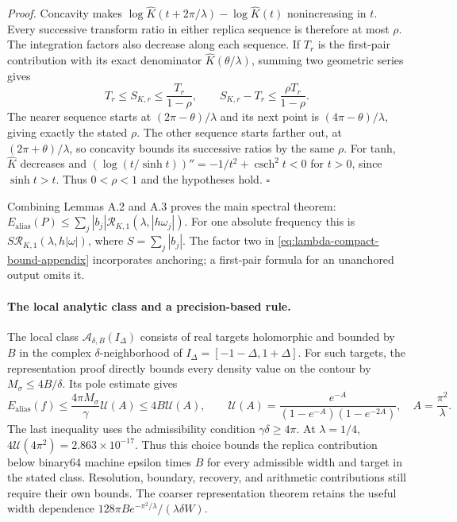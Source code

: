 \emph{Proof.}
Concavity makes
$\log \widehat K(t+2\pi/\lambda)-\log \widehat K(t)$ nonincreasing in $t$.
Every successive transform ratio in either replica sequence is therefore
at most $\rho$. The integration factors also decrease along each
sequence. If $T_r$ is the first-pair contribution with its exact
denominator $\widehat K(\theta/\lambda)$, summing two geometric series gives
\[
 T_r\le S_{K,r}\le\frac{T_r}{1-\rho},\qquad
 S_{K,r}-T_r\le\frac{\rho T_r}{1-\rho}.
\]
The nearer sequence starts at $(2\pi-\theta)/\lambda$ and its next
point is $(4\pi-\theta)/\lambda$, giving exactly the stated $\rho$.
The other sequence starts farther out, at $(2\pi+\theta)/\lambda$,
so concavity bounds its successive ratios by the same $\rho$.
For tanh, $\widehat K$ decreases and
$(\log(t/\sinh t))''=-1/t^2+\operatorname{csch}^2t<0$ for $t>0$,
since $\sinh t>t$. Thus $0<\rho<1$ and the hypotheses hold.
\hfill$\square$

Combining Lemmas A.2 and A.3 proves the main spectral theorem:
$E_{\mathrm{alias}}(P)\le\sum_j|b_j|
\mathcal R_{K,1}(\lambda,|h\omega_j|)$.
For one absolute frequency this is
$S\mathcal R_{K,1}(\lambda,h|\omega|)$, where
$S=\sum_j|b_j|$. The factor two in
\eqref{eq:lambda-compact-bound-appendix} incorporates anchoring; a
first-pair formula for an unanchored output omits it.

\paragraph{The local analytic class and a precision-based rule.}
The local class $\mathcal A_{\delta,B}(I_\Delta)$ consists of real targets
holomorphic and bounded by $B$ in the complex $\delta$-neighborhood of
$I_\Delta=[-1-\Delta,1+\Delta]$. For such targets, the representation
proof directly bounds every density value on the contour by
$M_\sigma\le4B/\delta$. Its pole estimate gives
\begin{equation}
 E_{\mathrm{alias}}(f)
 \le\frac{4\pi M_\sigma}{\gamma}\mathcal U(A)
 \le4B\mathcal U(A),\qquad
 \mathcal U(A)=\frac{e^{-A}}{(1-e^{-A})(1-e^{-2A})},\quad
 A=\frac{\pi^2}{\lambda}.
 \label{eq:lambda-local-class-budget}
\end{equation}
The last inequality uses the admissibility condition $\gamma\delta\ge4\pi$.
At $\lambda=1/4$, $4\mathcal U(4\pi^2)=2.863\times10^{-17}$.
Thus this choice bounds the replica contribution below binary64 machine
epsilon times $B$ for every admissible width and target in the stated
class. Resolution, boundary, recovery, and arithmetic contributions still
require their own bounds. The coarser representation theorem retains
the useful width dependence
$128\pi B e^{-\pi^2/\lambda}/(\lambda\delta W)$.

